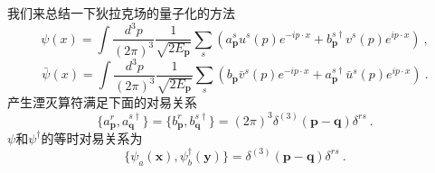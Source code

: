 
我们来总结一下狄拉克场的量子化的方法
\begin{equation}
\psi(x) = \int \frac{d^3 p}{(2\pi)^3} \frac{1}{\sqrt{2 E_{\mathbf p}}} \sum_s (a_{\mathbf p}^s u^s (p) e^{-ip\cdot x} + b_{\mathbf p}^{s\dagger} v^s(p) e^{ip\cdot x})~,
\end{equation}
\begin{equation}
\bar \psi (x) = \int \frac{d^3 p}{(2\pi)^3} \frac{1}{\sqrt{2 E_{\mathbf p}}} \sum_s (b_{\mathbf p}\bar v ^s(p) e^{- i p\cdot x}+ a_{\mathbf p}^{s\dagger} \bar u^s(p)e^{i p \cdot x})~.
\end{equation}
产生湮灭算符满足下面的对易关系
\begin{equation}
\{a_{\mathbf p}^r,a_{\mathbf q}^{s\dagger}\} = \{b_{\mathbf p}^r,b_{\mathbf q}^{s\dagger}\} = (2\pi)^3\delta^{(3)}(\mathbf p - \mathbf q)\delta^{rs}~.
\end{equation}
$\psi$和$\psi^\dagger$的等时对易关系为
\begin{equation}
\{\psi_a(\mathbf x),\psi_b^\dagger(\mathbf y)\} = \delta^{(3)}(\mathbf p - \mathbf q)\delta^{rs}~.
\end{equation}















